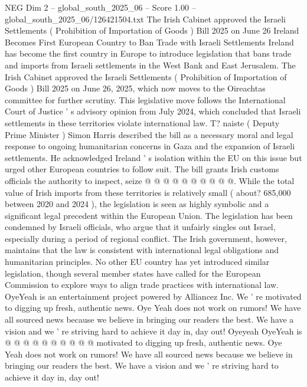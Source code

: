 \begin{textsample}{NEG Dim 2 – global\_south\_2025\_06 – Score 1.00 – global\_south\_2025\_06/126421504.txt}  \label{ex:f2_neg_196}
The Irish Cabinet approved the Israeli Settlements ( Prohibition of Importation of Goods ) Bill 2025 on June 26 Ireland Becomes First European Country to Ban Trade with Israeli Settlements Ireland has become the first country in Europe to introduce legislation that bans trade and imports from Israeli settlements in the West Bank and East Jerusalem.
The Irish Cabinet approved the Israeli Settlements ( Prohibition of Importation of Goods ) Bill 2025 on June 26, 2025, which now moves to the Oireachtas committee for further scrutiny.
This legislative move follows the International Court of Justice ' s advisory opinion from July 2024, which concluded that Israeli settlements in these territories violate international law.
T? naiste ( Deputy Prime Minister ) Simon Harris described the bill as a necessary moral and legal response to ongoing humanitarian concerns in Gaza and the expansion of Israeli settlements.
He acknowledged Ireland ' s isolation within the EU on this issue but urged other European countries to follow suit.
The bill grants Irish customs officials the authority to inspect, seize @ @ @ @ @ @ @ @ @ @.
While the total value of Irish imports from these territories is relatively small ( about? 685,000 between 2020 and 2024 ), the legislation is seen as highly symbolic and a significant legal precedent within the European Union.
The legislation has been condemned by Israeli officials, who argue that it unfairly singles out Israel, especially during a period of regional conflict.
The Irish government, however, maintains that the law is consistent with international legal obligations and humanitarian principles.
No other EU country has yet introduced similar legislation, though several member states have called for the European Commission to explore ways to align trade practices with international law.
OyeYeah is an entertainment project powered by Alliancez Inc.
We ' re motivated to digging up fresh, authentic news.
Oye Yeah does not work on rumors!
We have all sourced news because we believe in bringing our readers the best.
We have a vision and we ' re striving hard to achieve it day in, day out!
Oyeyeah OyeYeah is @ @ @ @ @ @ @ @ @ @ motivated to digging up fresh, authentic news.
Oye Yeah does not work on rumors!
We have all sourced news because we believe in bringing our readers the best.
We have a vision and we ' re striving hard to achieve it day in, day out!

\end{textsample}
